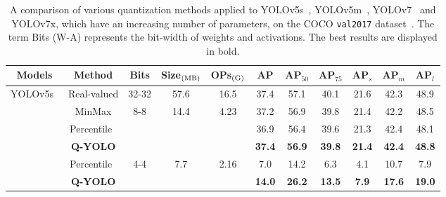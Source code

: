 \documentclass[runningheads]{llncs}
\begin{document}
\begin{table}[!t]
\centering
\caption{A comparison of various quantization methods applied to YOLOv5s~\cite{yolov5}, YOLOv5m~\cite{yolov5}, YOLOv7~\cite{wang2023yolov7} and YOLOv7x\cite{wang2023yolov7}, which have an increasing number of parameters, on the COCO {\tt val2017} dataset~\cite{lin2014microsoft}. The term Bits (W-A) represents the bit-width of weights and activations. The best results are displayed in bold.}
\small
\begin{tabular}{ccccccccccc}
\hline
Models                   & Method      & Bits                 & Size$_{\rm (MB)}$  & OPs$_{\rm (G)}$  & AP   & AP$_{50}$  & AP$_{75}$  & AP$_{s}$  & AP$_{m}$  & AP$_{l}$  \\ \hline
\multirow{6}{*}{YOLOv5s~\cite{yolov5}} & Real-valued & 32-32                & 57.6               & 16.5             & 37.4 & 57.1       & 40.1       & 21.6      & 42.3      & 48.9      \\ \cline{2-11} 
                         & MinMax      & \multirow{3}{*}{8-8} & \multirow{3}{*}{14.4} & \multirow{3}{*}{4.23}            & 37.2 & 56.9 & 39.8 & 21.4 & 42.2 & 48.5 \\
                         & Percentile~\cite{li2019fully}  & & &                                                                        & 36.9 & 56.4 & 39.6 & 21.3 & 42.4 & 48.1 \\
                         & \textbf{Q-YOLO}      &      &  &      & \textbf{37.4} & \textbf{56.9} & \textbf{39.8} & \textbf{21.4} & \textbf{42.4} & \textbf{48.8} \\  \cline{2-11} 
                         & Percentile~\cite{li2019fully}  & \multirow{2}{*}{4-4} & \multirow{2}{*}{7.7} & \multirow{2}{*}{2.16}            & 7.0    & 14.2 & 6.3  & 4.1  & 10.7 & 7.9  \\
                         & \textbf{Q-YOLO}      &      & &                & \textbf{14.0}   & \textbf{26.2} & \textbf{13.5} & \textbf{7.9}  & \textbf{17.6} & \textbf{19.0}   \\ \hline
                         

\end{tabular}
\end{table}
\end{document}
